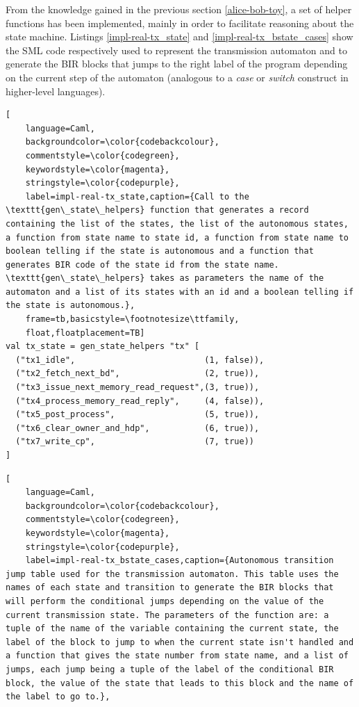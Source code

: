 \documentclass{kththesis}
\begin{document}
{From the knowledge gained in the previous section \ref{alice-bob-toy}, a set of helper functions has been implemented, mainly in order to facilitate reasoning about the state machine. Listings \ref{impl-real-tx_state} and \ref{impl-real-tx_bstate_cases} show the SML code respectively used to represent the transmission automaton and to generate the BIR blocks that jumps to the right label of the program depending on the current step of the automaton (analogous to a \textit{case} or \textit{switch} construct in higher-level languages).

\begin{lstlisting}[
    language=Caml,
    backgroundcolor=\color{codebackcolour},
    commentstyle=\color{codegreen},
    keywordstyle=\color{magenta},
    stringstyle=\color{codepurple},
    label=impl-real-tx_state,caption={Call to the \texttt{gen\_state\_helpers} function that generates a record containing the list of the states, the list of the autonomous states, a function from state name to state id, a function from state name to boolean telling if the state is autonomous and a function that generates BIR code of the state id from the state name. \texttt{gen\_state\_helpers} takes as parameters the name of the automaton and a list of its states with an id and a boolean telling if the state is autonomous.},
    frame=tb,basicstyle=\footnotesize\ttfamily,
    float,floatplacement=TB]
val tx_state = gen_state_helpers "tx" [
  ("tx1_idle",                          (1, false)),
  ("tx2_fetch_next_bd",                 (2, true)),
  ("tx3_issue_next_memory_read_request",(3, true)),
  ("tx4_process_memory_read_reply",     (4, false)),
  ("tx5_post_process",                  (5, true)),
  ("tx6_clear_owner_and_hdp",           (6, true)),
  ("tx7_write_cp",                      (7, true))
]
\end{lstlisting}
\begin{lstlisting}[
    language=Caml,
    backgroundcolor=\color{codebackcolour},
    commentstyle=\color{codegreen},
    keywordstyle=\color{magenta},
    stringstyle=\color{codepurple},
    label=impl-real-tx_bstate_cases,caption={Autonomous transition jump table used for the transmission automaton. This table uses the names of each state and transition to generate the BIR blocks that will perform the conditional jumps depending on the value of the current transmission state. The parameters of the function are: a tuple of the name of the variable containing the current state, the label of the block to jump to when the current state isn't handled and a function that gives the state number from state name, and a list of jumps, each jump being a tuple of the label of the conditional BIR block, the value of the state that leads to this block and the name of the label to go to.},

\end{lstlisting}}
\end{document}
